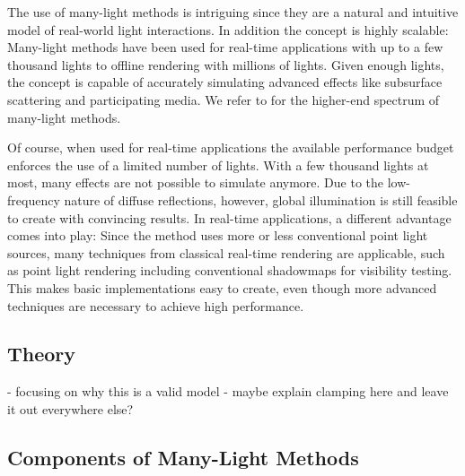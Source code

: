 
The use of many-light methods is intriguing since they are a natural and intuitive model of real-world light interactions. In addition the concept is highly scalable: Many-light methods have been used for real-time applications with up to a few thousand lights to offline rendering with millions of lights. Given enough lights, the concept is capable of accurately simulating advanced effects like subsurface scattering and participating media. We refer to \citet{Dachsbacher:2014:ManyLightsSTAR} for the higher-end spectrum of many-light methods.

Of course, when used for real-time applications the available performance budget enforces the use of a limited number of lights. With a few thousand lights at most, many effects are not possible to simulate anymore. Due to the low-frequency nature of diffuse reflections, however, global illumination is still feasible to create with convincing results. In real-time applications, a different advantage comes into play: Since the method uses more or less conventional point light sources, many techniques from classical real-time rendering are applicable, such as point light rendering including conventional shadowmaps for visibility testing. This makes basic implementations easy to create, even though more advanced techniques are necessary to achieve high performance.


\subsection{Theory}
- focusing on why this is a valid model
- maybe explain clamping here and leave it out everywhere else?


\subsection{Components of Many-Light Methods}

